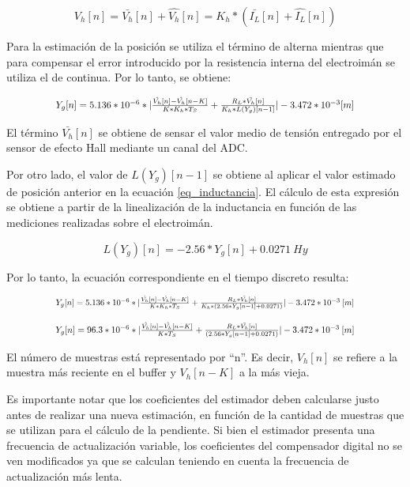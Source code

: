 \begin{equation} 
	V_h[n] = \bar{V_h}[n] + \hat{V_h}[n] = K_h * (\bar{I_L}[n] + \hat{I_L}[n])
\end{equation}

\noindent Para la estimación de la posición se utiliza el término de alterna mientras que para compensar el error introducido por la resistencia interna del electroimán se utiliza el de continua. Por lo tanto, se obtiene:

\begin{equation}
	\resizebox{.8\hsize}{!}
	{
	$Y_g[n] = 5.136*10^{-6}*|\frac{\hat{V_h}[n]-\hat{V_h}[n-K]}{K*K_h*T_S} + \frac{R_L*\bar{V_h}[n]}{K_h*L(Y_g)[n-1]}|-3.472*10^{-3}[m]$
	}
\end{equation}

\noindent El término $\bar{V_h}[n]$ se obtiene de sensar el valor medio de tensión entregado por el sensor de efecto Hall mediante un canal del ADC.

\noindent Por otro lado, el valor de $L(Y_g)[n-1]$ se obtiene al aplicar el valor estimado de posición anterior en la ecuación \ref{eq_inductancia}. El cálculo de esta expresión se obtiene a partir de la linealización de la inductancia en función de las mediciones realizadas sobre el electroimán.


\begin{equation} \label{eq_inductancia}
	L(Y_g)[n] = -2.56*Y_g[n]+0.0271\:Hy
\end{equation}

\noindent Por lo tanto, la ecuación correspondiente en el tiempo discreto resulta:

\begin{equation}
	\resizebox{.8\hsize}{!}
	{
	$Y_g[n] = 5.136*10^{-6}*|\frac{\hat{V_h}[n]-\hat{V_h}[n-K]}{K*K_h*T_S} + \frac{R_L*\bar{V_h}[n]}{K_h*(2.56*Y_g[n-1]+0.0271)}|-3.472*10^{-3}\:[m]$
	}
\end{equation}

\begin{equation}
	\resizebox{.8\hsize}{!}
	{
	$
	Y_g[n] = 96.3*10^{-6}*|\frac{\hat{V_h}[n]-\hat{V_h}[n-K]}{K*T_S} + \frac{R_L*\bar{V_h}[n]}{(2.56*Y_g[n-1]+0.0271)}|-3.472*10^{-3}\:[m]
	$
	}
\end{equation}


\noindent El número de muestras está representado por ``n''. Es decir, $V_h[n]$ se refiere a la muestra más reciente en el buffer y $V_h[n-K]$ a la más vieja.

Es importante notar que los coeficientes del estimador deben calcularse justo antes de realizar una nueva estimación,  en función de la cantidad de muestras que se utilizan para el cálculo de la pendiente. Si bien el estimador presenta una frecuencia de actualización variable, los coeficientes del compensador digital no se ven modificados ya que se calculan teniendo en cuenta la frecuencia de actualización más lenta.

